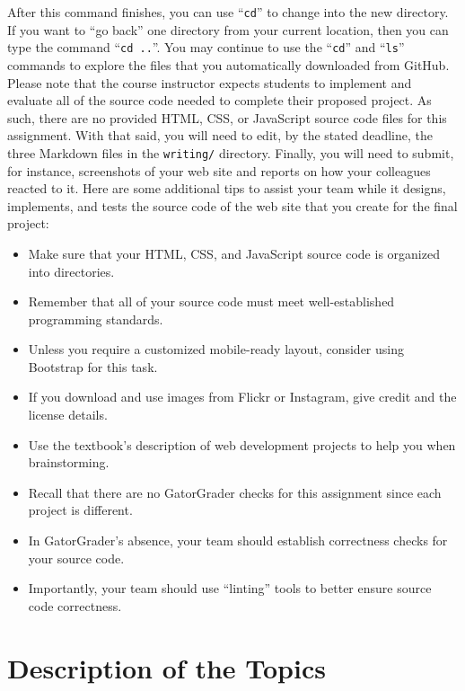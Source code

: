 \documentclass[11pt]{article}
\newcommand{\command}[1]{``\lstinline{#1}''}
\newcommand{\program}[1]{\lstinline{#1}}
\newcommand{\step}[1]{``{#1}''}
\begin{document}
After this command finishes, you can use \command{cd} to change into the new
directory. If you want to \step{go back} one directory from your current
location, then you can type the command \command{cd ..}. You may continue to use
the \command{cd} and \command{ls} commands to explore the files that you
automatically downloaded from GitHub. Please note that the course instructor
expects students to implement and evaluate all of the source code needed to
complete their proposed project. As such, there are no provided HTML, CSS, or
JavaScript source code files for this assignment. With that said, you will need
to edit, by the stated deadline, the three Markdown files in the
\program{writing/} directory. Finally, you will need to submit, for instance,
screenshots of your web site and reports on how your colleagues reacted to it.
Here are some additional tips to assist your team while it designs, implements,
and tests the source code of the web site that you create for the final project:

\begin{itemize}
  \setlength{\itemsep}{0in}
  \item Make sure that your HTML, CSS, and JavaScript source code is organized
    into directories.
  \item Remember that all of your source code must meet well-established programming standards.
  \item Unless you require a customized mobile-ready layout, consider using
    Bootstrap for this task.
  \item If you download and use images from Flickr or Instagram, give
    credit and the license details.
  \item Use the textbook's description of web development projects to
    help you when brainstorming.
  \item Recall that there are no GatorGrader checks for this assignment since each project is different.
  \item In GatorGrader's absence, your team should establish correctness checks for your source code.
  \item Importantly, your team should use ``linting'' tools to better ensure
    source code correctness.
\end{itemize}

\section*{Description of the Topics}
\end{document}
